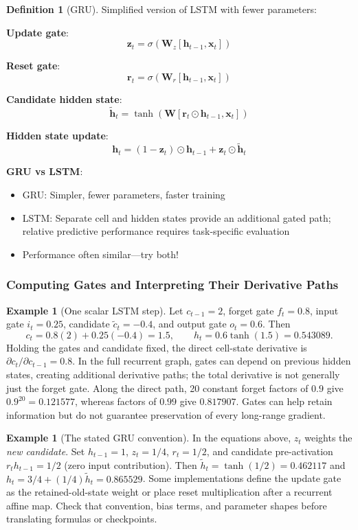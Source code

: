 \documentclass[11pt,twoside]{article}
\numberwithin{equation}{section}
\newcommand{\vect}[1]{\bm{#1}}
\theoremstyle{plain}
\theoremstyle{definition}
\newtheorem{definition}[theorem]{Definition}
\newtheorem{example}[theorem]{Example}
\theoremstyle{remark}
\begin{document}
\begin{definition}[GRU]
Simplified version of LSTM with fewer parameters:

\textbf{Update gate}:
\[
\vect{z}_t = \sigma(\vect{W}_z[\vect{h}_{t-1}, \vect{x}_t])
\]

\textbf{Reset gate}:
\[
\vect{r}_t = \sigma(\vect{W}_r[\vect{h}_{t-1}, \vect{x}_t])
\]

\textbf{Candidate hidden state}:
\[
\tilde{\vect{h}}_t = \tanh(\vect{W}[\vect{r}_t \odot \vect{h}_{t-1}, \vect{x}_t])
\]

\textbf{Hidden state update}:
\[
\vect{h}_t = (1 - \vect{z}_t) \odot \vect{h}_{t-1} + \vect{z}_t \odot \tilde{\vect{h}}_t
\]
\end{definition}

\textbf{GRU vs LSTM}:
\begin{itemize}
\item GRU: Simpler, fewer parameters, faster training
\item LSTM: Separate cell and hidden states provide an additional gated path; relative predictive performance requires task-specific evaluation
\item Performance often similar---try both!
\end{itemize}

\subsubsection{Computing Gates and Interpreting Their Derivative Paths}
\begin{example}[One scalar LSTM step]
Let $c_{t-1}=2$, forget gate $f_t=0.8$, input gate $i_t=0.25$, candidate $\tilde c_t=-0.4$, and output gate $o_t=0.6$. Then
\[
c_t=0.8(2)+0.25(-0.4)=1.5,\qquad h_t=0.6\tanh(1.5)=0.543089.
\]
Holding the gates and candidate fixed, the direct cell-state derivative is $\partial c_t/\partial c_{t-1}=0.8$. In the full recurrent graph, gates can depend on previous hidden states, creating additional derivative paths; the total derivative is not generally just the forget gate. Along the direct path, 20 constant forget factors of $0.9$ give $0.9^{20}=0.121577$, whereas factors of $0.99$ give $0.817907$. Gates can help retain information but do not guarantee preservation of every long-range gradient.
\end{example}

\begin{example}[The stated GRU convention]
In the equations above, $z_t$ weights the \emph{new candidate}. Set $h_{t-1}=1$, $z_t=1/4$, $r_t=1/2$, and candidate pre-activation $r_th_{t-1}=1/2$ (zero input contribution). Then $\tilde h_t=\tanh(1/2)=0.462117$ and $h_t=3/4+(1/4)\tilde h_t=0.865529$. Some implementations define the update gate as the retained-old-state weight or place reset multiplication after a recurrent affine map. Check that convention, bias terms, and parameter shapes before translating formulas or checkpoints.
\end{example}
\end{document}
